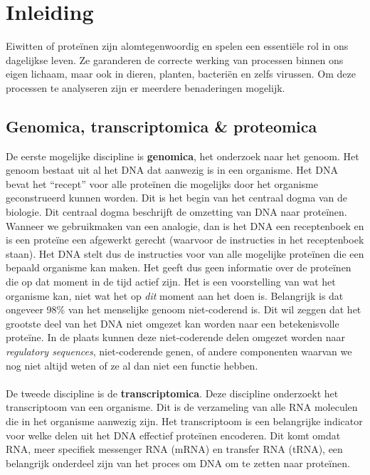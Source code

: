 \chapter{Inleiding}\label{ch:introductie}

Eiwitten of proteïnen zijn alomtegenwoordig en spelen een essentiële rol in ons dagelijkse leven.
Ze garanderen de correcte werking van processen binnen ons eigen lichaam, maar ook in dieren, planten, bacteriën en zelfs virussen.
Om deze processen te analyseren zijn er meerdere benaderingen mogelijk.


\section{Genomica, transcriptomica \& proteomica}\label{sec:genomica-transcriptomica-&-proteomica}
De eerste mogelijke discipline is \textbf{genomica}, het onderzoek naar het genoom.
Het genoom bestaat uit al het DNA dat aanwezig is in een organisme.
Het DNA bevat het ``recept'' voor alle proteïnen die mogelijks door het organisme geconstrueerd kunnen worden.
Dit is het begin van het centraal dogma van de biologie.
Dit centraal dogma beschrijft de omzetting van DNA naar proteïnen.
Wanneer we gebruikmaken van een analogie, dan is het DNA een receptenboek en is een proteïne een afgewerkt gerecht (waarvoor de instructies in het receptenboek staan).
Het DNA stelt dus de instructies voor van alle mogelijke proteïnen die een bepaald organisme kan maken.
Het geeft dus geen informatie over de proteïnen die op dat moment in de tijd actief zijn.
Het is een voorstelling van wat het organisme kan, niet wat het op \textit{dit} moment aan het doen is.
Belangrijk is dat ongeveer 98\% van het menselijke genoom niet-coderend is.
Dit wil zeggen dat het grootste deel van het DNA niet omgezet kan worden naar een betekenisvolle proteïne.
In de plaats kunnen deze niet-coderende delen omgezet worden naar \textit{regulatory sequences}, niet-coderende genen, of andere componenten waarvan we nog niet altijd weten of ze al dan niet een functie hebben.
\\ \\
De tweede discipline is de \textbf{transcriptomica}.
Deze discipline onderzoekt het transcriptoom van een organisme.
Dit is de verzameling van alle RNA moleculen die in het organisme aanwezig zijn.
Het transcriptoom is een belangrijke indicator voor welke delen uit het DNA effectief proteïnen encoderen.
Dit komt omdat RNA, meer specifiek messenger RNA (mRNA) en transfer RNA (tRNA), een belangrijk onderdeel zijn van het proces om DNA om te zetten naar proteïnen.
